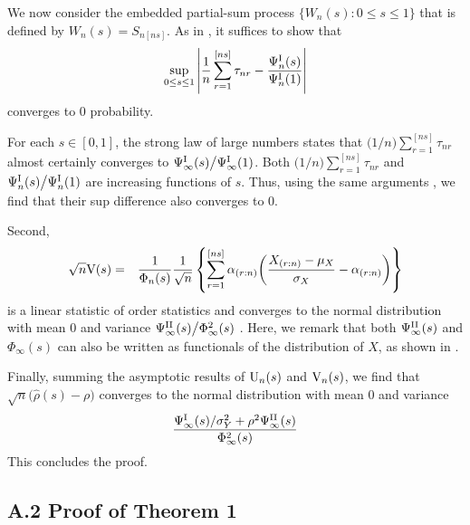 \documentclass[12pt]{article}
\begin{document}
We now consider the embedded partial-sum process $\big\{W_n(s): 0 \le s \le 1 \big\}$ that is defined by $W_n(s) =S_{n[ns]}$.
As in \citet{Bhattacharya:1974}, it suffices to show that
\begin{equation} \label{eqn:donsker1}
\sup_{0 \le s \le 1} \left|\frac{1}{n}\sum_{r=1}^{[ns]} \tau_{nr}  - \frac{\Psi_n^{\rm I}(s)}{\Psi_n^{\rm I}(1)} \right|
\end{equation}
converges to $0$ probability. 


For each $s \in [0,1]$, the strong law of large numbers states that $\big(1 \big/ n \big)\sum_{r=1}^{[ns]} \tau_{nr} $
almost certainly converges to $\Psi_{\infty}^{\rm I}(s)\big/\Psi_{\infty}^{\rm I}(1)$.  Both
$\big(1 \big/n \big) \sum_{r=1}^{[ns]} \tau_{nr}$ and $\Psi_n^{\rm I}(s)\big/\Psi_n^{\rm I}(1)$ are increasing functions
of $s$. Thus, using the same arguments \citep[pp. 62]{Shorack:2009}, we find
that their sup difference also converges to $0$.


Second, 
\begin{eqnarray} 
\sqrt{n} {\rm V}(s) &=& \frac{1}{\Phi_n(s)}  \frac{1}{\sqrt{n}} \left\{\sum_{r=1}^{[ns]} \alpha_{(r:n)} \bigg(  \frac{X_{(r:n)}-\mu_X}{\sigma_X} - \alpha_{(r:n)} \bigg) \right\}
\end{eqnarray}
is a linear statistic of order statistics and converges to the normal distribution with mean $0$ 
and variance $\Psi_{\infty}^{\rm II}(s) \big/ \Phi_{\infty}^2(s)$ \citep[Theorem 11.4]{David:2003}. Here, we remark that both $\Psi_{\infty}^{\rm II}(s)$ and $\Phi_{\infty}(s)$ can also be written as functionals of the 
distribution of $X$, as shown in \citep{David:2003}.


Finally, summing the asymptotic results of ${\rm U}_n(s)$ and ${\rm V}_n(s)$, we find that 
$
\sqrt{n} \big( \widehat{\rho}(s) - \rho \big)$ converges to the normal distribution with mean $0$
and variance 
\begin{equation}\nonumber
\frac{\Psi_{\infty}^{\rm I}(s)/\sigma_Y^2+\rho^2\Psi_{\infty}^{\rm II}(s)}{\Phi_{\infty}^2(s)}
\end{equation}
This concludes the proof. 


\subsection*{A.2 Proof of Theorem 1}
\end{document}

